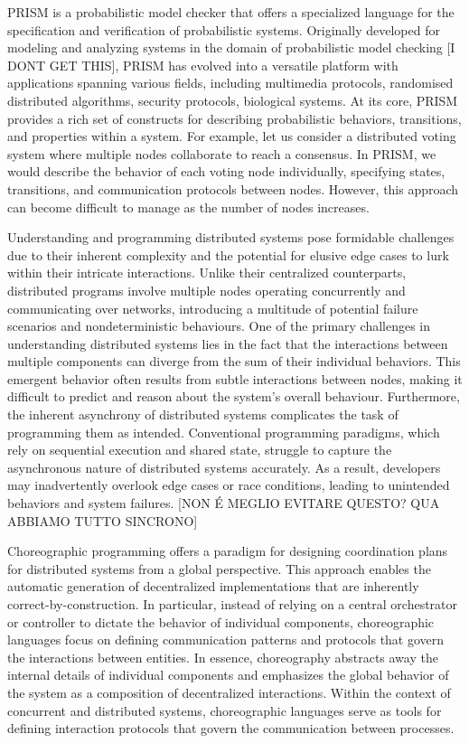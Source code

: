 PRISM \cite{PRISMdoc} is a probabilistic model checker that offers a
specialized language for the specification and verification of
probabilistic systems. Originally developed for modeling and analyzing
systems in the domain of probabilistic model checking [I DONT GET
THIS], PRISM has evolved into a versatile platform with applications
spanning various fields, including multimedia protocols, randomised
distributed algorithms, security protocols, biological systems.  At
its core, PRISM provides a rich set of constructs for describing
probabilistic behaviors, transitions, and properties within a system.
For example, let us consider a distributed voting system where
multiple nodes collaborate to reach a consensus. In PRISM, we would
describe the behavior of each voting node individually, specifying
states, transitions, and communication protocols between
nodes. However, this approach can become difficult to manage as the
number of nodes increases.

Understanding and programming distributed systems pose formidable
challenges due to their inherent complexity and the potential for
elusive edge cases to lurk within their intricate interactions. Unlike
their centralized counterparts, distributed programs involve multiple
nodes operating concurrently and communicating over networks,
introducing a multitude of potential failure scenarios and
nondeterministic behaviours.
%
One of the primary challenges in understanding distributed systems
lies in the fact that the interactions between multiple components can
diverge from the sum of their individual behaviors. This emergent
behavior often results from subtle interactions between nodes, making
it difficult to predict and reason about the system's overall
behaviour.
%
Furthermore, the inherent asynchrony of distributed systems
complicates the task of programming them as intended. Conventional
programming paradigms, which rely on sequential execution and shared
state, struggle to capture the asynchronous nature of distributed
systems accurately. As a result, developers may inadvertently overlook
edge cases or race conditions, leading to unintended behaviors and
system failures. [NON É MEGLIO EVITARE QUESTO? QUA ABBIAMO TUTTO
SINCRONO]

Choreographic programming offers a paradigm for designing coordination
plans for distributed systems from a global perspective. This approach
enables the automatic generation of decentralized implementations that
are inherently correct-by-construction.
%
In particular, instead of relying on a central orchestrator or
controller to dictate the behavior of individual components,
choreographic languages focus on defining communication patterns and
protocols that govern the interactions between entities.
%
In essence, choreography abstracts away the internal details of
individual components and emphasizes the global behavior of the system
as a composition of decentralized interactions. Within the context of
concurrent and distributed systems, choreographic languages serve as
tools for defining interaction protocols that govern the communication
between processes.


